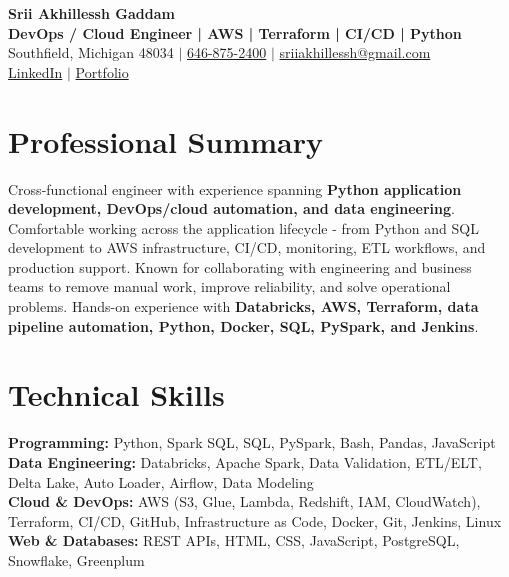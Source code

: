 \documentclass[letterpaper,10pt]{article}
\begin{document}
\fontsize{9.35pt}{10.45pt}\selectfont

\begin{center}
    {\LARGE \textbf{Srii Akhillessh Gaddam}} \\[-1pt]
    \textbf{DevOps / Cloud Engineer | AWS | Terraform | CI/CD | Python} \\[2pt]
    Southfield, Michigan 48034 $|$
    \href{tel:6468752400}{646-875-2400} $|$
    \href{mailto:sriiakhillessh@gmail.com}{sriiakhillessh@gmail.com} \\[1pt]
    \href{https://www.linkedin.com/in/srii-akhiilessh-gaddam-b48668191/}{LinkedIn} $|$
    \href{https://sriiakhillesshg.github.io/portfolio/}{Portfolio}
\end{center}
\vspace{-8pt}

\section{Professional Summary}
\small{Cross-functional engineer with experience spanning \textbf{Python application development, DevOps/cloud automation, and data engineering}. Comfortable working across the application lifecycle - from Python and SQL development to AWS infrastructure, CI/CD, monitoring, ETL workflows, and production support. Known for collaborating with engineering and business teams to remove manual work, improve reliability, and solve operational problems. Hands-on experience with \textbf{Databricks, AWS, Terraform, data pipeline automation, Python, Docker, SQL, PySpark, and Jenkins}.}

\section{Technical Skills}
\small{
\textbf{Programming:} Python, Spark SQL, SQL, PySpark, Bash, Pandas, JavaScript \\
\textbf{Data Engineering:} Databricks, Apache Spark, Data Validation, ETL/ELT, Delta Lake, Auto Loader, Airflow, Data Modeling \\
\textbf{Cloud \& DevOps:} AWS (S3, Glue, Lambda, Redshift, IAM, CloudWatch), Terraform, CI/CD, GitHub, Infrastructure as Code, Docker, Git, Jenkins, Linux \\
\textbf{Web \& Databases:} REST APIs, HTML, CSS, JavaScript, PostgreSQL, Snowflake, Greenplum
}
\end{document}
